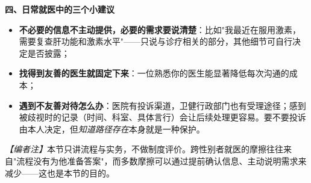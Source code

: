 \textbf{四、日常就医中的三个小建议}
\begin{itemize}
\item \textbf{不必要的信息不主动提供，必要的需求要说清楚}：比如"我最近在服用激素，需要复查肝功能和激素水平"——只说与诊疗相关的部分，其他细节可自行决定是否披露；
\item \textbf{找得到友善的医生就固定下来}：一位熟悉你的医生能显著降低每次沟通的成本；
\item \textbf{遇到不友善对待怎么办}：医院有投诉渠道，卫健行政部门也有受理途径；感到被歧视时的记录（时间、科室、具体言行）会让后续处理更容易。要不要投诉由本人决定，但\emph{知道路径存在}本身就是一种保护。
\end{itemize}

\noindent\textit{【编者注】}本节只讲流程与实务，不做制度评价。跨性别者就医的摩擦往往来自"流程没有为他准备答案"，而多数摩擦可以通过提前确认信息、主动说明需求来减少——这也是本节的目的。
